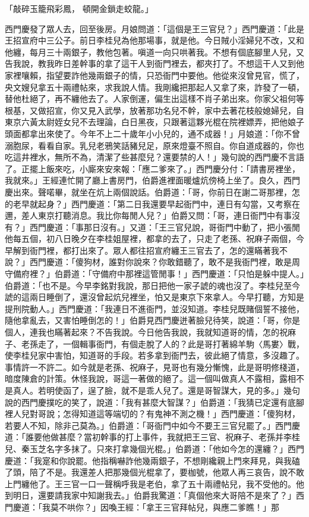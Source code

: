「敲碎玉籠飛彩鳳，  頓開金鎖走蛟龍。」

西門慶發了眾人去，回至後房。月娘問道：「這個是王三官兒？」西門慶道：「此是王招宣府中三公子。前日李桂兒為他那場事，就是他。今日賊小淫婦兒不改，又和他纏，每月三十兩銀子，教他包著。嗔道一向只哄著我。不想有個底腳里人兒，又告我說，教我昨日差幹事的拿了這干人到衙門裡去，都夾打了。不想這干人又到他家裡嚷賴，指望要詐他幾兩銀子的情，只恐衙門中要他。他從來沒曾見官，慌了，央文嫂兒拿五十兩禮帖來，求我說人情。我剛纔把那起人又拿了來，詐發了一頓，替他杜絕了，再不纏他去了。人家倒運，偏生出這樣不肖子弟出來。你家父祖何等根基，又做招宣，你又見入武學，放著那功名兒不幹，家中去著花枝般媳婦兒，自東京六黃太尉姪女兒不去理論，白日黑夜，只跟著這夥光棍在院裡嫖弄，把他娘子頭面都拿出來使了。今年不上二十歲年小小兒的，通不成器！」月娘道：「你不曾溺胞尿，看看自家。乳兒老鴉笑話豬兒足，原來燈臺不照自。你自道成器的，你也吃這井裡水，無所不為，清潔了些甚麼兒？還要禁的人！」幾句說的西門慶不言語了。正擺上飯來吃，小廝來安來報：「應二爹來了。」西門慶分付：「請書房裡坐，我就來。」王經連忙開了廳上書房門，伯爵進裡面暖爐炕傍椅上坐了。良久，西門慶出來。聲喏畢，就坐在炕上兩個說話。伯爵道：「哥，你前日在謝二哥那裡，怎的老早就起身？」西門慶道：「第二日我還要早起衙門中，連日有勾當，又考察在邇，差人東京打聽消息。我比你每閒人兒？」伯爵又問：「哥，連日衙門中有事沒有？」西門慶道：「事那日沒有。」又道：「王三官兒說，哥衙門中動了，把小張閒他每五個，初八日晚夕在李桂姐屋裡，都拿的去了，只走了老孫、祝麻子兩個，今早解到衙門裡，都打出來了。眾人都往招宣府纏王三官去了，怎的還瞞著我不說？」西門慶道：「傻狗材，誰對你說來？你敢錯聽了，敢不是我衙門裡，敢是周守備府裡？」伯爵道：「守備府中那裡這管閒事！」西門慶道：「只怕是躲中提人。」伯爵道：「也不是。今早李銘對我說，那日把他一家子諕的魂也沒了。李桂兒至今諕的這兩日睡倒了，還沒曾起炕兒裡坐，怕又是東京下來拿人。今早打聽，方知是提刑院動人。」西門慶道：「我連日不進衙門，並沒知道。李桂兒既賭個誓不接他，隨他拿亂去，又害怕睡倒怎的！」伯爵見西門慶迸著臉兒待笑，說道：「哥，你是個人，連我也瞞著起來？不告我說。今日他告我說，我就知道哥的情，怎的祝麻子、老孫走了，一個輯事衙門，有個走脫了人的？此是哥打著綿羊駒〈馬婁〉戰，使李桂兒家中害怕，知道哥的手段。若多拿到衙門去，彼此絕了情意，多沒趣了。事情許一不許二。如今就是老孫、祝麻子，見哥也有幾分慚愧，此是哥明修棧道，暗度陳倉的計策。休怪我說，哥這一著做的絕了。這一個叫做真人不露相，露相不是真人。若明使函了，逞了臉，就不是乖人兒了。還是哥智謀大，見的多。」幾句說的西門慶撲吃的笑了，說道：「我有甚麼大智謀？」伯爵道：「我猜已定還有底腳裡人兒對哥說；怎得知道這等端切的？有鬼神不測之機！」西門慶道：「傻狗材，若要人不知，除非己莫為。」伯爵道：「哥衙門中如今不要王三官兒罷了。」西門慶道：「誰要他做甚麼？當初幹事的打上事件，我就把王三官、祝麻子、老孫并李桂兒、秦玉芝名字多抹了。只來打拿幾個光棍。」伯爵道：「他如今怎的還纏？」西門慶道：「我寔和你說罷。他指稱嚇詐他幾兩銀子，不想剛纔親上門來拜見，與我磕了頭，陪了不是。我還差人把那幾個光棍拿了，要枷號，他眾人再三哀告，說不敢上門纏他了。王三官一口一聲稱呼我是老伯，拿了五十兩禮帖兒，我不受他的。他到明日，還要請我家中知謝我去。」伯爵我驚道：「真個他來大哥陪不是來了？」西門慶道：「我莫不哄你？」因喚王經：「拿王三官拜帖兒，與應二爹瞧！」那